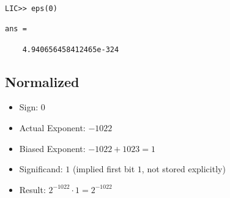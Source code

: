 \documentclass[a4paper,10pt]{article}
\begin{document}
\begin{verbatim}
LIC>> eps(0)

ans =

    4.940656458412465e-324
\end{verbatim}

\subsection{Normalized}
\begin{itemize}
    \item Sign: $0$
    \item Actual Exponent: $-1022$
    \item Biased Exponent: $-1022 + 1023 = 1$
    \item Significand: $1$ (implied first bit $1$, not stored explicitly)
    \item Result: $2^{-1022} \cdot 1 = 2^{-1022}$
\end{itemize}
\end{document}
